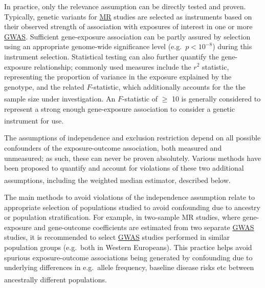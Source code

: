 \documentclass[
]{article}
\begin{document}
In practice, only the relevance assumption can be directly tested and proven. Typically, genetic variants for \hyperref[acronyms_MR]{MR} studies are selected as instruments based on their observed strength of association with exposures of interest in one or more \hyperref[acronyms_GWAS]{GWAS}. Sufficient gene-exposure association can be partly assured by selection using an appropriate genome-wide significance level (e.g.~\(p < 10 ^{-8}\)) during this instrument selection. Statistical testing can also further quantify the gene-exposure relationship; commonly used measures include the \(r^2\) statistic, representing the proportion of variance in the exposure explained by the genotype, and the related \(F\)-statistic, which additionally accounts for the the sample size under investigation\textsuperscript{}. An \(F\)-statistic of \(\ge\) 10 is generally considered to represent a strong enough gene-exposure association to consider a genetic instrument for use\textsuperscript{}.

The assumptions of independence and exclusion restriction depend on all possible confounders of the exposure-outcome association, both measured and unmeasured; as such, these can never be proven absolutely. Various methods have been proposed to quantify and account for violations of these two additional assumptions, including the weighted median estimator, described below\textsuperscript{}.

The main methods to avoid violations of the independence assumption relate to appropriate selection of populations studied to avoid confounding due to ancestry or population stratification. For example, in two-sample MR studies, where gene-exposure and gene-outcome coefficients are estimated from two separate \hyperref[acronyms_GWAS]{GWAS} studies, it is recommended to select \hyperref[acronyms_GWAS]{GWAS} studies performed in similar population groups (e.g.~both in Western Europeans). This practice helps avoid spurious exposure-outcome associations being generated by confounding due to underlying differences in e.g.~allele frequency, baseline disease risks etc between ancestrally different populations\textsuperscript{}.
\end{document}
